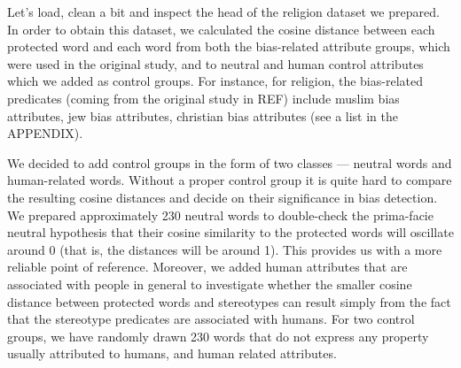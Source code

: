 \documentclass[12pt,]{book}
\begin{document}
Let's load, clean a bit and inspect the head of the religion dataset we
prepared. In order to obtain this dataset, we calculated the cosine
distance between each protected word and each word from both the
bias-related attribute groups, which were used in the original study,
and to neutral and human control attributes which we added as control
groups. For instance, for religion, the bias-related predicates (coming
from the original study in REF) include muslim bias attributes, jew bias
attributes, christian bias attributes (see a list in the APPENDIX).

We decided to add control groups in the form of two classes --- neutral
words and human-related words. Without a proper control group it is
quite hard to compare the resulting cosine distances and decide on their
significance in bias detection. We prepared approximately 230 neutral
words to double-check the prima-facie neutral hypothesis that their
cosine similarity to the protected words will oscillate around 0 (that
is, the distances will be around 1). This provides us with a more
reliable point of reference. Moreover, we added human attributes that
are associated with people in general to investigate whether the smaller
cosine distance between protected words and stereotypes can result
simply from the fact that the stereotype predicates are associated with
humans. For two control groups, we have randomly drawn 230 words that do
not express any property usually attributed to humans, and human related
attributes.

\vspace{1mm} \footnotesize
\end{document}
